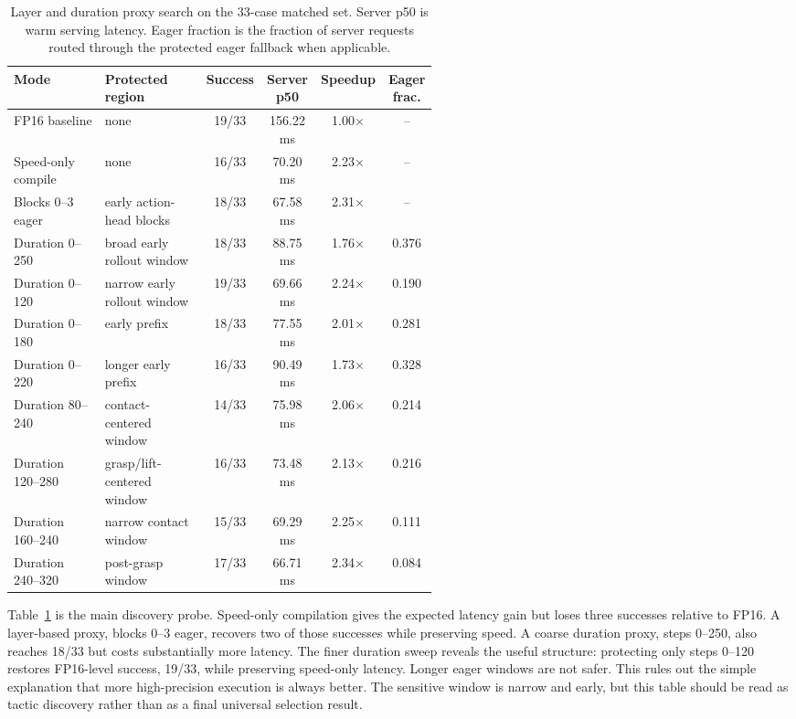 \documentclass[10pt]{article}
\begin{document}
\begin{table}[H]
\centering
\scriptsize
\setlength{\tabcolsep}{2.5pt}
\caption{Layer and duration proxy search on the 33-case matched set. Server p50 is warm serving latency. Eager fraction is the fraction of server requests routed through the protected eager fallback when applicable.}
\label{tab:phase29-speed-behavior}
\begin{tabular}{p{0.26\linewidth}p{0.28\linewidth}cccc}
\toprule
Mode & Protected region & Success & Server p50 & Speedup & Eager frac. \\
\midrule
FP16 baseline & none & 19/33 & 156.22 ms & 1.00$\times$ & -- \\
Speed-only compile & none & 16/33 & 70.20 ms & 2.23$\times$ & -- \\
Blocks 0--3 eager & early action-head blocks & 18/33 & 67.58 ms & 2.31$\times$ & -- \\
Duration 0--250 & broad early rollout window & 18/33 & 88.75 ms & 1.76$\times$ & 0.376 \\
Duration 0--120 & narrow early rollout window & 19/33 & 69.66 ms & 2.24$\times$ & 0.190 \\
Duration 0--180 & early prefix & 18/33 & 77.55 ms & 2.01$\times$ & 0.281 \\
Duration 0--220 & longer early prefix & 16/33 & 90.49 ms & 1.73$\times$ & 0.328 \\
Duration 80--240 & contact-centered window & 14/33 & 75.98 ms & 2.06$\times$ & 0.214 \\
Duration 120--280 & grasp/lift-centered window & 16/33 & 73.48 ms & 2.13$\times$ & 0.216 \\
Duration 160--240 & narrow contact window & 15/33 & 69.29 ms & 2.25$\times$ & 0.111 \\
Duration 240--320 & post-grasp window & 17/33 & 66.71 ms & 2.34$\times$ & 0.084 \\
\bottomrule
\end{tabular}
\end{table}

Table~\ref{tab:phase29-speed-behavior} is the main discovery probe. Speed-only compilation gives the expected latency gain but loses three successes relative to FP16. A layer-based proxy, blocks 0--3 eager, recovers two of those successes while preserving speed. A coarse duration proxy, steps 0--250, also reaches 18/33 but costs substantially more latency. The finer duration sweep reveals the useful structure: protecting only steps 0--120 restores FP16-level success, 19/33, while preserving speed-only latency. Longer eager windows are not safer. This rules out the simple explanation that more high-precision execution is always better. The sensitive window is narrow and early, but this table should be read as tactic discovery rather than as a final universal selection result.
\end{document}
